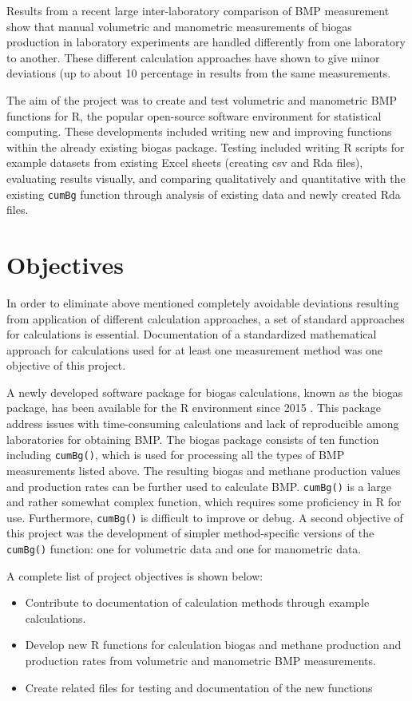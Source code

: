 \documentclass{article}
\begin{document}
Results from a recent large inter-laboratory comparison of BMP measurement show that manual volumetric and manometric measurements of biogas production in laboratory experiments are handled differently from one laboratory to another. These different calculation approaches have shown to give minor deviations (up to about 10 percentage in results from the same measurements.

The aim of the project was to create and test volumetric and manometric BMP functions for R, the popular open-source software environment for statistical computing. These developments included writing new and improving functions within the already existing biogas package. Testing included writing R scripts for example datasets from existing Excel sheets (creating csv and Rda files), evaluating results visually, and comparing qualitatively and quantitative with the existing \texttt{cumBg} function through analysis of existing data and newly created Rda files.  

\section{Objectives}
In order to eliminate above mentioned completely avoidable deviations resulting from application of different calculation approaches, a set of standard approaches for calculations is essential. Documentation of a standardized mathematical approach for calculations used for at least one measurement method was one objective of this project.

A newly developed software package for biogas calculations, known as the biogas package, has been available for the R environment since 2015 \cite{softwarex}. This package address issues with time-consuming calculations and lack of reproducible among laboratories for obtaining BMP.
The biogas package consists of ten function including \texttt{cumBg()}, which is used for processing all the types of BMP measurements listed above. The resulting biogas and methane production values and production rates can be further used to calculate BMP. \texttt{cumBg()} is a large and rather somewhat complex function, which requires some proficiency in R for use. Furthermore, \texttt{cumBg()} is difficult to improve or debug. 
A second objective of this project was the development of simpler method-specific versions of the \texttt{cumBg()} function: one for volumetric data and one for manometric data.

A complete list of project objectives is shown below:
\begin{itemize}
  \item Contribute to documentation of calculation methods through example calculations.
  \item Develop new R functions for calculation biogas and methane production and production rates from volumetric and manometric BMP measurements.
  \item Create related files for testing and documentation of the new functions
\end{itemize}
\end{document}
